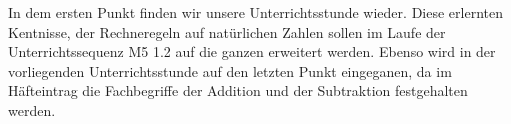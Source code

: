 In dem ersten Punkt finden wir unsere Unterrichtsstunde wieder. Diese erlernten Kentnisse, der Rechneregeln auf natürlichen Zahlen sollen im Laufe der Unterrichtssequenz M5 1.2 auf die ganzen erweitert werden. Ebenso wird in der vorliegenden Unterrichtsstunde auf den letzten Punkt eingeganen, da im Häfteintrag die Fachbegriffe der Addition und der Subtraktion festgehalten werden. 